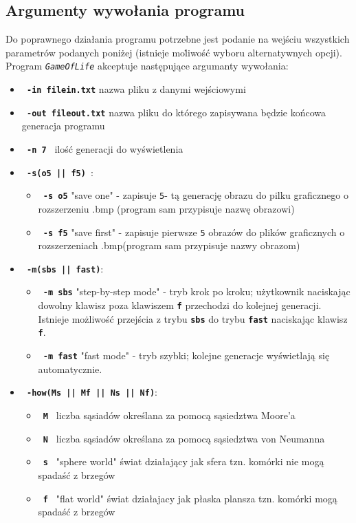 \documentclass[a4paper]{article}
\begin{document}
\subsection{Argumenty wywo\l{}ania programu}
\quad Do poprawnego dzia\l{}ania programu potrzebne jest podanie na wej\'sciu wszystkich parametr\'ow podanych poni\.zej (istnieje mo\.liwo\'s\'c wyboru alternatywnych opcji). Program \texttt{\textit{GameOfLife}} akceptuje nast\k{e}puj\k{a}ce argumanty wywo\l{}ania:
\begin{itemize}
	\item \textbf{\texttt{ -in filein.txt}} nazwa pliku z danymi wej\'sciowymi
	\item \textbf{\texttt{ -out fileout.txt}} nazwa pliku do kt\'orego zapisywana b\k{e}dzie ko\'ncowa generacja programu
	\item \textbf{\texttt{ -n 7 }} ilo\'s\'c generacji do wy\'swietlenia
	\item \textbf{\texttt{ -s(o5 || f5) }}:
		\begin{itemize}
			\item \textbf{\texttt{ -s o5}} "save one" - zapisuje \texttt{5}- t\k{a} generacj\k{e} obrazu do pilku graficznego o rozszerzeniu .bmp (program sam przypisuje nazw\k{e} obrazowi)
			\item \textbf{\texttt{ -s f5}} "save first" - zapisuje pierwsze \texttt{5} obraz\'ow do plik\'ow graficznych o rozszerzeniach .bmp(program sam przypisuje nazwy obrazom)

		\end{itemize}
	\item \textbf{\texttt{ -m(sbs || fast)}}:
		\begin{itemize}
			\item \textbf{\texttt{ -m sbs}} "step-by-step mode" - tryb krok po kroku; u\.zytkownik naciskaj\k{a}c dowolny klawisz poza klawiszem \texttt{\textbf{f}} przechodzi do kolejnej generacji. 
				Istnieje mo\.zliwo\'s\'c przej\'scia z trybu \texttt{\textbf{sbs}} do trybu \texttt{\textbf{fast}} naciskaj\k{a}c klawisz \texttt{\textbf{f}}.
			\item \textbf{\texttt{ -m fast}} "fast mode" - tryb szybki; kolejne generacje wy\'swietlaj\k{a} si\k{e} automatycznie.
		\end{itemize}
	\item \textbf{\texttt{ -how(Ms || Mf || Ns || Nf)}}:
		\begin{itemize}
			\item \textbf{\texttt{ M }} liczba s\k{a}siad\'ow okre\'slana za pomoc\k{a} s\k{a}siedztwa Moore'a
			\item \textbf{\texttt{ N }} liczba s\k{a}siad\'ow okre\'slana za pomoc\k{a} s\k{a}siedztwa von Neumanna
			\item \textbf{\texttt{ s }} "sphere world" \'swiat dzia\l{}aj\k{a}cy jak sfera tzn. kom\'orki nie mog\k{a} spada\'s\'c z brzeg\'ow
			\item \textbf{\texttt{ f }} "flat world" \'swiat dzia\l{}ajacy jak p\l{}aska plansza tzn. kom\'orki mog\k{a} spada\'s\'c z brzeg\'ow\\


\end{itemize}
\end{itemize}
\end{document}
